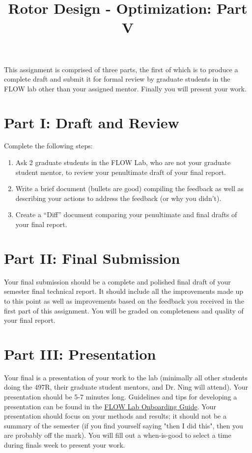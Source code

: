 \documentclass[12pt]{article}
\title{Rotor Design - Optimization: Part V}
\date{}
\begin{document}
\maketitle
\vspace{-3.5cm}

This assignment is comprised of three parts, the first of which is to produce a complete draft and submit it for formal review by graduate students in the FLOW lab other than your assigned mentor. Finally you will present your work.
	
\section{Part I: Draft and Review}

 Complete the following steps:



\begin{enumerate}[label=\alph*.]
	\item Ask 2 graduate students in the FLOW Lab, who are not your graduate student mentor, to review your penultimate draft of your final report.
	\item Write a brief document (bullets are good) compiling the feedback as well as describing your actions to address the feedback (or why you didn't).
	\item Create a ``Diff'' document comparing your penultimate and final drafts of your final report.
\end{enumerate}



\section{Part II: Final Submission}

Your final submission should be a complete and polished final draft of your semester final technical report.
It should include all the improvements made up to this point as well as improvements based on the feedback you received in the first part of this assignment.
You will be graded on completeness and quality of your final report.


\section{Part III: Presentation}
Your final is a presentation of your work to the lab (minimally all other students doing the 497R, their graduate student mentors, and Dr. Ning will attend). Your presentation should be 5-7 minutes long. Guidelines and tips for developing a presentation can be found in the \href{https://flow.byu.edu/onboarding/presentations/}{FLOW Lab Onboarding Guide}. Your presentation should focus on your methods and results; it should not be a summary of the semester (if you find yourself saying "then I did this", then you are probably off the mark). You will fill out a when-is-good to select a time during finals week to present your work. 
	
\end{document}
